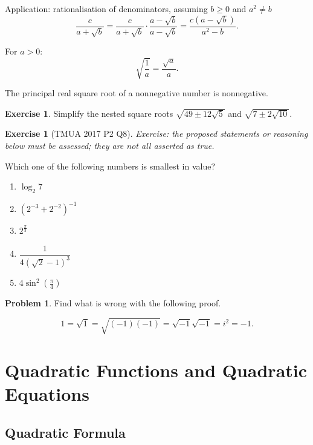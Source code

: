 \documentclass[11pt]{article}
\theoremstyle{definition}
\newtheorem{example}[theorem]{Exercise}
\newtheorem{problem}[theorem]{Problem}
\theoremstyle{remark}
\newcommand{\pqty}[1]{\left(#1\right)}
\newcommand{\flatfrac}[2]{\frac{#1}{#2}}
\begin{document}
Application: rationalisation of denominators, assuming \(b\ge0\) and \(a^2\ne b\)
\[
    \frac{c}{a + \sqrt{b}} = \frac{c}{a + \sqrt{b}} \cdot \frac{a - \sqrt{b}}{a - \sqrt{b}} = \frac{c \pqty{a - \sqrt{b}}}{a^2 - b}.
\]

For \(a>0\):
\[
    \sqrt{\frac{1}{a}} = \frac{\sqrt{a}}{a}.
\]

The principal real square root of a nonnegative number is nonnegative.

\begin{example}\label{tmua-1-unit-013}
    Simplify the nested square roots \(\sqrt{49 \pm 12 \sqrt{5}}\) and \(\sqrt{7 \pm 2 \sqrt{10}}\).
\end{example}

\begin{example}[TMUA 2017 P2 Q8]\label{tmua-1-unit-014}
\textit{Exercise: the proposed statements or reasoning below must be assessed; they are not all asserted as true.}\par

    Which one of the following numbers is smallest in value?

    \begin{enumerate}
        \item \(\log_2 7\)
        \item \(\pqty{2^{-3} + 2^{-2}}^{-1}\)
        \item \(2^{\flatfrac{\pi}{3}}\)
        \item \(\dfrac{1}{4\pqty{\sqrt{2} - 1}^3}\)
        \item \(4 \sin^2 \pqty{\flatfrac{\pi}{4}}\)
    \end{enumerate}
\end{example}

\begin{problem}\label{tmua-1-unit-015}
    Find what is wrong with the following proof.

    \[
        1 = \sqrt{1} = \sqrt{\pqty{-1} \pqty{-1}} = \sqrt{-1} \sqrt{-1} = i^2 = -1.
    \]  
\end{problem}

\section{Quadratic Functions and Quadratic Equations}\label{tmua-1-section-005}
\subsection{Quadratic Formula}\label{tmua-1-subsection-003}
\end{document}

